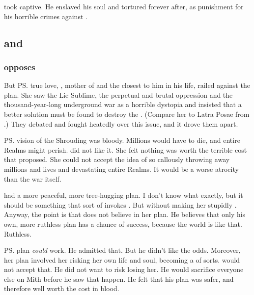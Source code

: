 \Secherdamon took \Morcariel captive. 
He enslaved his soul and tortured \Morcariel forever after, as punishment for his horrible crimes against \dragonkind. 









\subsection{\Ishnaruchaefir and \Rystessakhin}





\subsubsection{\Rystessakhin opposes \Ishnaruchaefir}
But \ps{\Ishnaruchaefir} true love, , mother of  and the \dragon{} closest to him in his life, railed against the plan. 
She saw the Lie Sublime, the perpetual and brutal oppression and the thousand-year-long underground war as a horrible dystopia and insisted that a better solution must be found to destroy the \banes. 
(Compare her to Latra Posae from \cite{RobertJordan:WorldofWOT}.) 
They debated and fought heatedly over this issue, and it drove them apart. 

\ps{\Ishnaruchaefir} vision of the Shrouding was bloody. 
Millions would have to die, and entire Realms might perish. 
\Rystessakhin{} did not like it. 
She felt nothing was worth the terrible cost that \Ishnaruchaefir{} proposed. 
She could not accept the idea of so callously throwing away millions and lives and devastating entire Realms. 
It would be a worse atrocity than the war itself. 

\Rystessakhin{} had a more peaceful, more tree-hugging plan. 
I don't know what exactly, but it should be something that sort of invokes . 
But without making her stupidly . 
Anyway, the point is that \Ishnaruchaefir{} does not believe in her plan. 
He believes that only his own, more ruthless plan has a chance of success, because the world is like that. 
Ruthless. 

\ps{\Rystessakhin} plan \emph{could} work. 
He admitted that. 
But he didn't like the odds. 
Moreover, her plan involved her risking her own life and soul, becoming a  of sorts. 
\Ishnaruchaefir{} would not accept that. 
He did not want to risk losing her.
He would sacrifice everyone else on Mith before he saw that happen. 
He felt that his plan was safer, and therefore well worth the cost in blood. 

